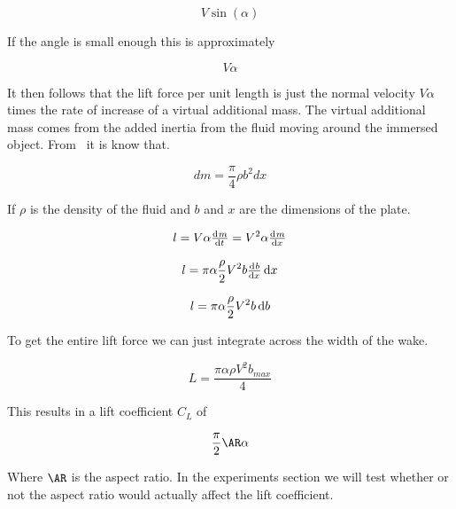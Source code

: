 \[V\sin(\alpha)\]

If the angle is small enough this is approximately

\[V\alpha\]


It then follows that the lift force per unit length is just the normal velocity $V\alpha$ times the
rate of increase of a virtual additional mass. The virtual additional mass comes from the
added inertia from the fluid moving around the immersed object. From~\cite{jones} it is know that.

\begin{equation}
dm=\frac{\pi}{4}\rho b^2 dx
\end{equation}

If $\rho$ is the density of the fluid and $b$ and $x$ are the dimensions of the plate.

\[l = V\alpha \od{m}{t} = V^2\alpha \od{m}{x} \]

\[l = \pi \alpha \frac{\rho}{2}V^2 b \od{b}{x} \dif{x} \]

\[l = \pi \alpha \frac{\rho}{2} V^2 b \dif{b} \]

To get the entire lift force we can just integrate across the width of the wake. 

\[L = \frac{\pi \alpha \rho V^2 b_{max}}{4} \]

This results in a lift coefficient $C_L$ of

\begin{equation}
 \frac{\pi}{2} \AR \alpha 
 \label{eq:bollay_model}
 \end{equation}

Where $\AR$ is the aspect ratio. In the experiments section we will test whether or not the aspect ratio
would actually affect the lift coefficient.




